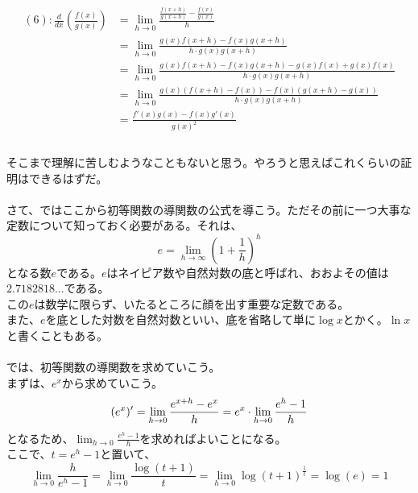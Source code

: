 \documentclass[a4j,dvipdfmx]{jsarticle}
\begin{document}
    \begin{align*}
        (6):\frac{d}{dx}(\frac{f(x)}{g(x)})&=\lim_{h\rightarrow0}\frac{\frac{f(x+h)}{g(x+h)}-\frac{f(x)}{g(x)}}{h}\\
        &=\lim_{h\rightarrow0}\frac{g(x)f(x+h)-f(x)g(x+h)}{h\cdot g(x)g(x+h)}\\
        &=\lim_{h\rightarrow0}\frac{g(x)f(x+h)-f(x)g(x+h)-g(x)f(x)+g(x)f(x)}{h\cdot g(x)g(x+h)}\\
        &=\lim_{h\rightarrow0}\frac{g(x)(f(x+h)-f(x))-f(x)(g(x+h)-g(x))}{h\cdot g(x)g(x+h)}\\
        &=\frac{f'(x)g(x)-f(x)g'(x)}{g(x)^2}\\
    \end{align*}\\
    そこまで理解に苦しむようなこともないと思う。やろうと思えばこれくらいの証明はできるはずだ。\\\\
    さて、ではここから初等関数の導関数の公式を導こう。ただその前に一つ大事な定数について知っておく必要がある。それは、\\
    \begin{equation}
        e=\lim_{h\rightarrow\infty}(1+\frac{1}{h})^h
    \end{equation}
    となる数$e$である。$e$はネイピア数や自然対数の底と呼ばれ、おおよその値は$2.7182818...$である。\\
    この$e$は数学に限らず、いたるところに顔を出す重要な定数である。\\
    また、$e$を底とした対数を自然対数といい、底を省略して単に$\log x$とかく。$\ln x$と書くこともある。\\
    \\
    では、初等関数の導関数を求めていこう。\\
    まずは、$e^x$から求めていこう。\\
    \begin{equation*}
        (e^x)'=\lim_{h\rightarrow0}\frac{e^{x+h}-e^x}{h}=e^x\cdot\lim_{h\rightarrow0}\frac{e^{h}-1}{h}\\
    \end{equation*}
    となるため、$\lim_{h\rightarrow0}\frac{e^{h}-1}{h}$を求めればよいことになる。\\
    ここで、$t=e^h-1$と置いて、\\
    \begin{equation*}
        \lim_{h\rightarrow0}\frac{h}{e^h-1}=\lim_{h\rightarrow0}\frac{\log(t+1)}{t}
        =\lim_{h\rightarrow0}\log(t+1)^{\frac{1}{t}}=\log(e)=1
    \end{equation*}
\end{document}
